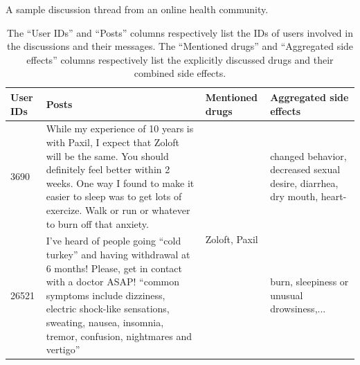 \documentclass{bmcart}
\begin{document}
\begin{backmatter}
\begin{table}[h!]
  \caption{A sample discussion thread from an online health community.}
  \footnotesize
  \begin{tabular}{l p{6.5cm} p{1.5cm} p{2cm} }
    \hline
	User IDs & Posts & Mentioned drugs & Aggregated side effects\\ \hline
	3690 & While my experience of 10 years is with Paxil, I expect that Zoloft will be the same. You should definitely feel better within 2 weeks. One way I found to make it easier to sleep was to get lots of exercize. Walk or run or whatever to burn off that anxiety. & \multirow{2}{*}{Zoloft, Paxil} & changed behavior, decreased sexual desire, diarrhea, dry mouth, heart-  \\
        26521 & I've heard of people going ``cold turkey'' and having withdrawal at 6 months! Please, get in contact with a doctor ASAP! ``common symptoms include dizziness, electric shock-like sensations, sweating, nausea, insomnia, tremor, confusion, nightmares and vertigo'' &  & burn, sleepiness or unusual drowsiness,... \\ \hline
  \end{tabular}
  \caption*{The ``User IDs'' and ``Posts'' columns respectively list the IDs of users involved in the discussions and their messages. The ``Mentioned drugs'' and ``Aggregated side effects'' columns respectively list the explicitly discussed drugs and their combined side effects.}
  \label{table:sample_thread}
\end{table}


\end{backmatter}
\end{document}
